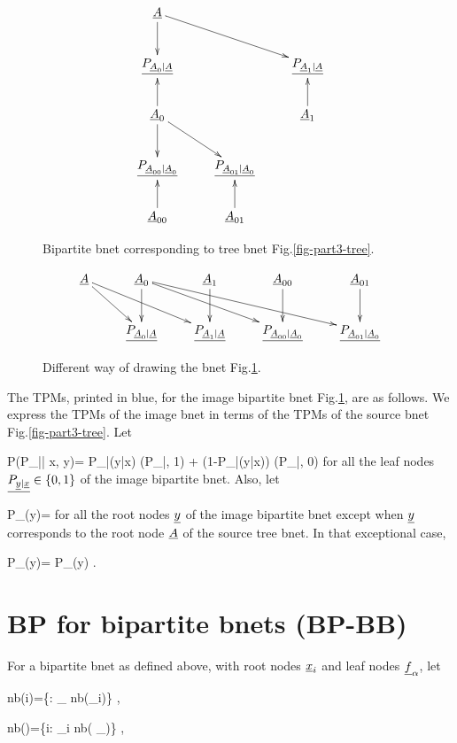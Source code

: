 \begin{figure}[h!]
$$\xymatrix{
\rvA\ar[d]\ar[rrd]
\\
\ul{P_{\rvA_0|\rvA}}&&\ul{P_{\rvA_1|\rvA}}
\\
\rvA_0\ar[u]\ar[d]\ar[rd]&&\rvA_1\ar[u]
\\
\ul{P_{\rvA_{00}|\rvA_0}}&\ul{P_{\rvA_{01}|\rvA_0}}
\\
\rvA_{00}\ar[u]&\rvA_{01}\ar[u]
}
$$
\caption{Bipartite bnet
corresponding
to tree bnet Fig.\ref{fig-part3-tree}.}
\label{fig-part3-tree-junc-tree}
\end{figure}

\begin{figure}[h!]
\centering
$$\xymatrix{
\rvA\ar[dr]\ar[drr]
&\rvA_{0}\ar[d]\ar[drr]\ar[drrr]
&\rvA_{1}\ar[d]
&\rvA_{00}\ar[d]
&\rvA_{01}\ar[d]
\\
&\ul{P_{\rvA_{0}|\rvA}}
&\ul{P_{\rvA_{1}|\rvA}}
&\ul{P_{\rvA_{00}|\rvA_0}}
&\ul{P_{\rvA_{01}|\rvA_0}}
}$$
\caption{
Different
way of drawing
the bnet Fig.\ref{fig-part3-tree-junc-tree}.}
\label{fig-part3-tree-bip-bnet}
\end{figure}

The TPMs, printed in blue,
for the image bipartite bnet
Fig.\ref{fig-part3-tree-junc-tree},
are as follows. We express the
TPMs of the image bnet
in terms of the
TPMs of the source bnet
Fig.\ref{fig-part3-tree}. Let

\beq\color{blue}
P(P_{\rvy|\rvx}| x, y)=
P_{\rvy|\rvx}(y|x)
\delta(P_{\rvy|\rvx}, 1)
+
(1-P_{\rvy|\rvx}(y|x))
\delta(P_{\rvy|\rvx}, 0)
\eeq
for all the
leaf
nodes $\ul{P_{\rvy|\rvx}}\in \bool$ of the
image bipartite bnet.
Also, let

\beq\color{blue}
P_\rvy(y)= 
\;
\eeq
for all the root nodes 
$\rvy$ of the
image bipartite bnet
except when
$\rvy$ corresponds to
the root node $\rvA$
of the source tree bnet.
In that exceptional case,

\beq\color{blue}
P_\rvy(y)= P_\rvA(y)
\;.
\eeq


\section{BP for
bipartite bnets (BP-BB)}
For
a bipartite
bnet as defined above,
with
root nodes $\rvx_i$
and leaf nodes $\rvf_\alp$,
let


\beq
nb(i)=\{\alp: \rvf_\alpha\in
nb(\rvx_i)\}
\;,
\eeq

\beq
nb(\alpha)=\{i: \rvx_i\in
nb( \rvf_\alpha)\}
\;,
\eeq

